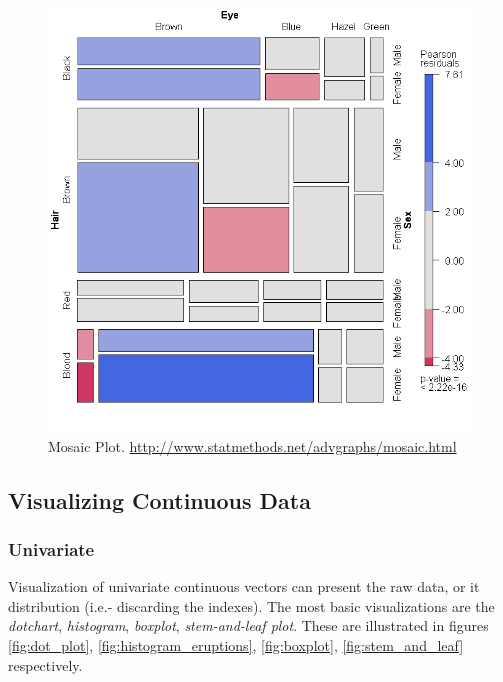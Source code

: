 \begin{figure}[h]
\centering
\includegraphics[height=0.3\textheight]{art/mosaic1}
\caption[Mosaic Plot]{Mosaic Plot. \newline
\url{http://www.statmethods.net/advgraphs/mosaic.html}}
\label{fig:mosaic}
\end{figure}







\afterpage{\clearpage}


\subsection{Visualizing Continuous Data}




\subsubsection{Univariate}
Visualization of univariate continuous vectors can present the raw data, or it distribution (i.e.- discarding the indexes).
The most basic visualizations are the \emph{dotchart}, \emph{histogram}, \emph{boxplot}, \emph{stem-and-leaf plot}. 
These are illustrated in figures \ref{fig:dot_plot}, \ref{fig:histogram_eruptions}, \ref{fig:boxplot}, \ref{fig:stem_and_leaf} respectively. 


